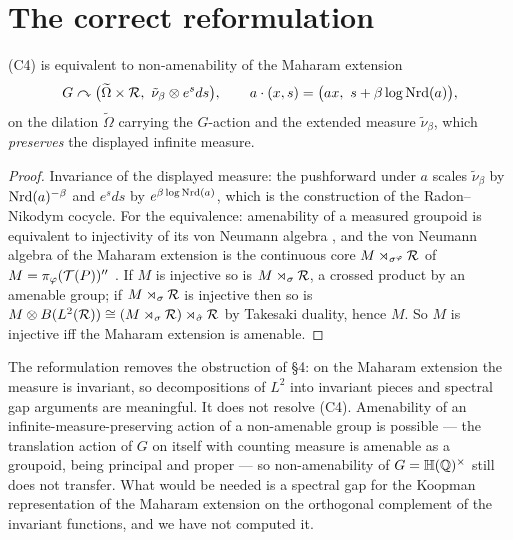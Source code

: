 \section{The correct reformulation}

\begin{proposition}[Maharam]\label{XI:prop:maharam}
(C4) is equivalent to non-amenability of the Maharam extension \cite{Maharam}
\[
G\curvearrowright\bigl(\widetilde\Omega\times\R,\ \tilde\nu_\beta\otimes e^{s}ds\bigr),
\qquad a\cdot(x,s)=\bigl(ax,\ s+\beta\log\Nrd(a)\bigr),
\]
on the dilation $\widetilde\Omega$ carrying the $G$-action and the extended measure
$\tilde\nu_\beta$, which \emph{preserves} the displayed infinite measure.
\end{proposition}

\begin{proof}
Invariance of the displayed measure: the pushforward under $a$ scales $\tilde\nu_\beta$ by
$\operatorname{Nrd}(a)^{-\beta}$ and $e^sds$ by $e^{\beta\log\operatorname{Nrd}(a)}$, which is the construction of the
Radon--Nikodym cocycle. For
the equivalence: amenability of a measured groupoid is equivalent to injectivity of its
von Neumann algebra \cite{AD}, and the von Neumann algebra of the Maharam extension is the
continuous core $M\rtimes_{\sigma^\varphi}\mathcal{R}$ of $M=\pi_\varphi(\mathcal{T}(P))''$ \cite[Ch.~XII]{Takesaki}.
If $M$ is injective so is $M\rtimes_{\sigma}\mathcal{R}$, a crossed product by an amenable group; if
$M\rtimes_\sigma\mathcal{R}$ is injective then so is $M\otimes B(L^2(\mathcal{R}))\cong(M\rtimes_\sigma\mathcal{R})\rtimes_{\hat\sigma}\mathcal{R}$
by Takesaki duality, hence $M$. So $M$ is injective iff the Maharam extension is amenable.
\end{proof}

\begin{remark}\label{XI:rem:maharamstatus}
The reformulation removes the obstruction of \S4: on the Maharam extension the measure is
invariant, so decompositions of $L^2$ into invariant pieces and spectral gap arguments are
meaningful. It does not resolve (C4). Amenability of an infinite-measure-preserving action of
a non-amenable group is possible --- the translation action of $G$ on itself with counting
measure is amenable as a groupoid, being principal and proper --- so non-amenability of
$G=\mathbb{H}(\mathbb{Q})^\times$ still does not transfer. What would be needed is a spectral gap for the
Koopman representation of the Maharam extension on the orthogonal complement of the invariant
functions, and we have not computed it.
\end{remark}

